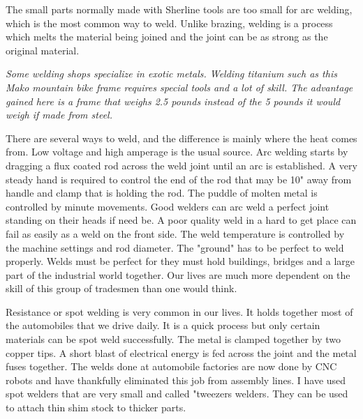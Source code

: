 
The small parts normally made with Sherline tools are too small for arc welding,
which is the most common way to weld. Unlike brazing, welding is a process which
melts the material being joined and the joint can be as strong as the original
material.

\bigskip
\textit{Some welding shops specialize in exotic metals. Welding titanium such as
this Mako mountain bike frame requires special tools and a lot of skill. The
advantage gained here is a frame that weighs 2.5 pounds instead of the 5 pounds
it would weigh if made from steel.}
\bigskip

There are several ways to weld, and the difference is mainly where the heat
comes from. Low voltage and high amperage is the usual source. Arc welding
starts by dragging a flux coated rod across the weld joint until an arc is
established. A very steady hand is required to control the end of the rod that
may be 10" away from handle and clamp that is holding the rod. The puddle of
molten metal is controlled by minute movements. Good welders can arc weld a
perfect joint standing on their heads if need be. A poor quality weld in a hard
to get place can fail as easily as a weld on the front side. The weld
temperature is controlled by the machine settings and rod diameter. The "ground"
has to be perfect to weld properly. Welds must be perfect for they must hold
buildings, bridges and a large part of the industrial world together. Our lives
are much more dependent on the skill of this group of tradesmen than one would
think.


Resistance or spot welding is very common in our lives. It holds together most
of the automobiles that we drive daily. It is a quick process but only certain
materials can be spot weld successfully. The metal is clamped together by two
copper tips. A short blast of electrical energy is fed across the joint and the
metal fuses together. The welds done at automobile factories are now done by CNC
robots and have thankfully eliminated this job from assembly lines. I have used
spot welders that are very small and called "tweezers welders. They can be used
to attach thin shim stock to thicker parts.


